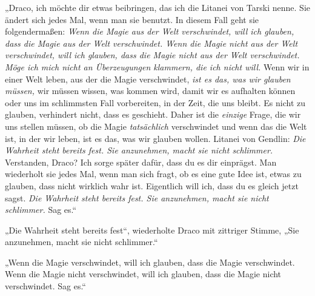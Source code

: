 „Draco, ich möchte dir etwas beibringen, das ich die Litanei von Tarski nenne. Sie ändert sich jedes Mal, wenn man sie benutzt. In diesem Fall geht sie folgendermaßen: \emph{Wenn die Magie aus der Welt verschwindet, will ich glauben, dass die Magie aus der Welt verschwindet. Wenn die Magie nicht aus der Welt verschwindet, will ich glauben, dass die Magie nicht aus der Welt verschwindet. Möge ich mich nicht an Überzeugungen klammern, die ich nicht will.} Wenn wir in einer Welt leben, aus der die Magie verschwindet, \emph{ist es das, was wir glauben müssen,} wir müssen wissen, was kommen wird, damit wir es aufhalten können oder uns im schlimmsten Fall vorbereiten, in der Zeit, die uns bleibt. Es nicht zu glauben, verhindert nicht, dass es geschieht. Daher ist die \emph{einzige} Frage, die wir uns stellen müssen, ob die Magie \emph{tatsächlich} verschwindet und wenn das die Welt ist, in der wir leben, ist es das, was wir glauben wollen. Litanei von Gendlin: \emph{Die Wahrheit steht bereits fest. Sie anzunehmen, macht sie nicht schlimmer.} Verstanden, Draco? Ich sorge später dafür, dass du es dir einprägst. Man wiederholt sie jedes Mal, wenn man sich fragt, ob es eine gute Idee ist, etwas zu glauben, dass nicht wirklich wahr ist. Eigentlich will ich, dass du es gleich jetzt sagst. \emph{Die Wahrheit steht bereits fest. Sie anzunehmen, macht sie nicht schlimmer.} Sag es.“%

„Die Wahrheit steht bereits fest“, wiederholte Draco mit zittriger Stimme,
„Sie anzunehmen, macht sie nicht schlimmer.“

„Wenn die Magie verschwindet, will ich glauben, dass die Magie verschwindet. Wenn die Magie nicht verschwindet, will ich glauben, dass die Magie nicht verschwindet. Sag es.“

